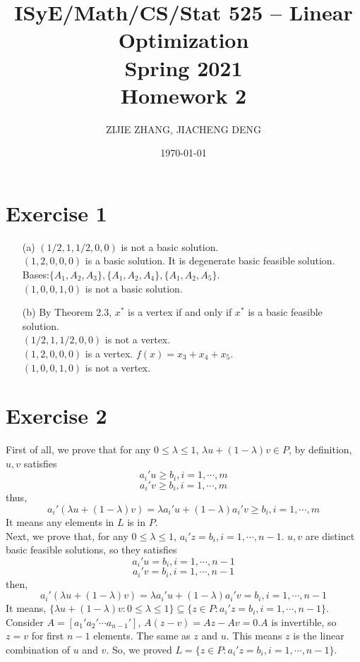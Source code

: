 \documentclass{article}
\title{ISyE/Math/CS/Stat 525 – Linear Optimization\\Spring 2021\\Homework 2}
\author{ZIJIE ZHANG, JIACHENG DENG}
\date\today
\begin{document}
\maketitle
\section*{Exercise 1}
\begin{itemize}
	\item[(a)]
		$(1/2, 1, 1/2, 0, 0)$ is not a basic solution.\\
		$(1, 2, 0, 0, 0)$ is a basic solution. It is degenerate basic feasible solution. Bases:$\{A_1, A_2, A_3\}, \{A_1, A_2, A_4\}, \{A_1, A_2, A_5\}$.\\
		$(1, 0, 0, 1, 0)$ is not a basic solution.
	\item[(b)]
	By Theorem 2.3, $x^*$ is a vertex if and only if $x^*$ is a basic feasible solution.\\
	$(1/2, 1, 1/2, 0, 0)$ is not a vertex.\\
	$(1, 2, 0, 0, 0)$ is a vertex. $f(x) = x_3+x_4+x_5$.\\
	$(1, 0, 0, 1, 0)$ is not a vertex.
\end{itemize}
\section*{Exercise 2}
First of all, we prove that for any $0 \leqslant \lambda \leqslant 1$, $\lambda u + (1-\lambda)v \in P$, by definition, $u, v$ satisfies
	$$a_i' u \geqslant b_i, i = 1, \cdots, m$$
	$$a_i' v \geqslant b_i, i = 1, \cdots, m$$
thus, $$a_i' (\lambda u + (1-\lambda)v) = \lambda a_i' u + (1-\lambda)a_i'v \geqslant b_i, i = 1, \cdots, m$$
It means any elements in $L$ is in $P$.\\
Next, we prove that, for any $0 \leqslant \lambda \leqslant 1$, $a_i' z = b_i, i=1,\cdots, n-1$. $u, v$ are distinct basic feasible solutions, so they satisfies
	$$a_i' u = b_i, i = 1, \cdots, n-1$$
	$$a_i' v = b_i, i = 1, \cdots, n-1$$
then, $$a_i' (\lambda u + (1-\lambda)v) = \lambda a_i' u + (1-\lambda) a_i' v = b_i, i = 1, \cdots, n-1$$
It means, $\{\lambda u +(1-\lambda) v: 0\leqslant \lambda \leqslant 1\}\subseteq \{z\in P:a_i' z=b_i, i = 1,\cdots, n-1\}$.\\
Consider $A = [a_1' a_2' \cdots a_{n-1}']$, $A(z-v)=Az-Av=0$.$A$ is invertible, so $z=v$ for first $n-1$ elements. The same as $z$ and $u$. This means $z$ is the linear combination of $u$ and $v$.
So, we proved $L = \{z \in P: a_i'z=b_i, i=1,\cdots,n-1\}$.
\end{document}
